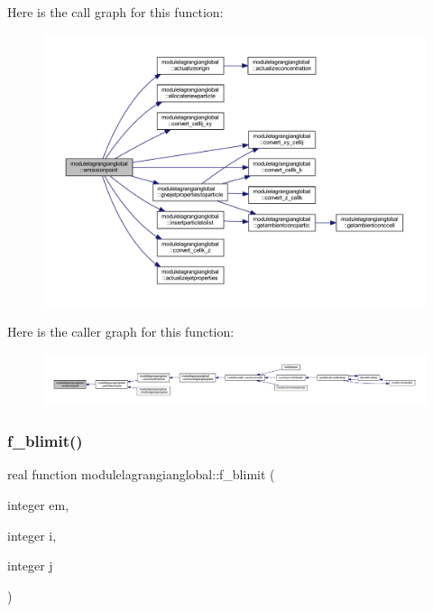 Here is the call graph for this function\+:\nopagebreak
\begin{figure}[H]
\begin{center}
\leavevmode
\includegraphics[width=350pt]{namespacemodulelagrangianglobal_a9d524fab1163e87ac878a520ae670bf9_cgraph}
\end{center}
\end{figure}
Here is the caller graph for this function\+:\nopagebreak
\begin{figure}[H]
\begin{center}
\leavevmode
\includegraphics[width=350pt]{namespacemodulelagrangianglobal_a9d524fab1163e87ac878a520ae670bf9_icgraph}
\end{center}
\end{figure}
\mbox{\label{namespacemodulelagrangianglobal_ae741ac31795a4ede3b77f20ffacd71c0}} 
\subsubsection{\texorpdfstring{f\+\_\+blimit()}{f\_blimit()}}
{\footnotesize\ttfamily real function modulelagrangianglobal\+::f\+\_\+blimit (\begin{DoxyParamCaption}\item[{integer}]{em,  }\item[{integer}]{i,  }\item[{integer}]{j }\end{DoxyParamCaption})\hspace{0.3cm}{\ttfamily [private]}}

